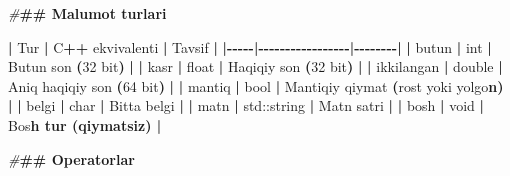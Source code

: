 \documentclass[a4paper,11pt,twoside,openright]{book}
\newenvironment{Shaded}{\begin{snugshade}}{\end{snugshade}}
\newcommand{\BuiltInTok}[1]{#1}
\newcommand{\CharTok}[1]{\textcolor[rgb]{0.31,0.60,0.02}{#1}}
\newcommand{\DecValTok}[1]{\textcolor[rgb]{0.00,0.00,0.81}{#1}}
\newcommand{\ErrorTok}[1]{\textcolor[rgb]{0.64,0.00,0.00}{\textbf{#1}}}
\newcommand{\NormalTok}[1]{#1}
\newcommand{\OperatorTok}[1]{\textcolor[rgb]{0.81,0.36,0.00}{\textbf{#1}}}
\newcommand{\PreprocessorTok}[1]{\textcolor[rgb]{0.56,0.35,0.01}{\textit{#1}}}
\begin{document}
\begin{Shaded}
\begin{Highlighting}[]
\PreprocessorTok{\#}\ErrorTok{\#\# Ma\textquotesingle{}lumot turlari}

\OperatorTok{|}\NormalTok{ Tur }\OperatorTok{|}\NormalTok{ C}\OperatorTok{++}\NormalTok{ ekvivalenti }\OperatorTok{|}\NormalTok{ Tavsif }\OperatorTok{|}
\OperatorTok{|{-}{-}{-}{-}{-}|{-}{-}{-}{-}{-}{-}{-}{-}{-}{-}{-}{-}{-}{-}{-}{-}{-}|{-}{-}{-}{-}{-}{-}{-}{-}|}
\OperatorTok{|} \ErrorTok{\textasciigrave{}}\NormalTok{butun}\ErrorTok{\textasciigrave{}} \OperatorTok{|} \ErrorTok{\textasciigrave{}}\NormalTok{int}\ErrorTok{\textasciigrave{}} \OperatorTok{|}\NormalTok{ Butun son }\OperatorTok{(}\DecValTok{32}\NormalTok{ bit}\OperatorTok{)} \OperatorTok{|}
\OperatorTok{|} \ErrorTok{\textasciigrave{}}\NormalTok{kasr}\ErrorTok{\textasciigrave{}} \OperatorTok{|} \ErrorTok{\textasciigrave{}}\NormalTok{float}\ErrorTok{\textasciigrave{}} \OperatorTok{|}\NormalTok{ Haqiqiy son }\OperatorTok{(}\DecValTok{32}\NormalTok{ bit}\OperatorTok{)} \OperatorTok{|}
\OperatorTok{|} \ErrorTok{\textasciigrave{}}\NormalTok{ikkilangan}\ErrorTok{\textasciigrave{}} \OperatorTok{|} \ErrorTok{\textasciigrave{}}\NormalTok{double}\ErrorTok{\textasciigrave{}} \OperatorTok{|}\NormalTok{ Aniq haqiqiy son }\OperatorTok{(}\DecValTok{64}\NormalTok{ bit}\OperatorTok{)} \OperatorTok{|}
\OperatorTok{|} \ErrorTok{\textasciigrave{}}\NormalTok{mantiq}\ErrorTok{\textasciigrave{}} \OperatorTok{|} \ErrorTok{\textasciigrave{}}\NormalTok{bool}\ErrorTok{\textasciigrave{}} \OperatorTok{|}\NormalTok{ Mantiqiy qiymat }\OperatorTok{(}\ErrorTok{\textasciigrave{}}\NormalTok{rost}\ErrorTok{\textasciigrave{}}\NormalTok{ yoki }\ErrorTok{\textasciigrave{}}\NormalTok{yolg}\CharTok{\textquotesingle{}o}\ErrorTok{n\textasciigrave{}) |}
\OperatorTok{|} \ErrorTok{\textasciigrave{}}\NormalTok{belgi}\ErrorTok{\textasciigrave{}} \OperatorTok{|} \ErrorTok{\textasciigrave{}}\NormalTok{char}\ErrorTok{\textasciigrave{}} \OperatorTok{|}\NormalTok{ Bitta belgi }\OperatorTok{|}
\OperatorTok{|} \ErrorTok{\textasciigrave{}}\NormalTok{matn}\ErrorTok{\textasciigrave{}} \OperatorTok{|} \ErrorTok{\textasciigrave{}}\BuiltInTok{std::}\NormalTok{string}\ErrorTok{\textasciigrave{}} \OperatorTok{|}\NormalTok{ Matn satri }\OperatorTok{|}
\OperatorTok{|} \ErrorTok{\textasciigrave{}}\NormalTok{bosh}\ErrorTok{\textasciigrave{}} \OperatorTok{|} \ErrorTok{\textasciigrave{}}\NormalTok{void}\ErrorTok{\textasciigrave{}} \OperatorTok{|}\NormalTok{ Bo}\CharTok{\textquotesingle{}s}\ErrorTok{h tur (qiymatsiz) |}

\PreprocessorTok{\#}\ErrorTok{\#\# Operatorlar}


\end{Highlighting}
\end{Shaded}
\end{document}
